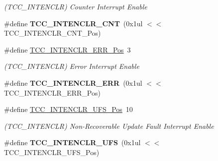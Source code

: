 \begin{DoxyCompactItemize}
\begin{DoxyCompactList}\small\item\em (T\+C\+C\+\_\+\+I\+N\+T\+E\+N\+C\+L\+R) Counter Interrupt Enable \end{DoxyCompactList}\item 
\hypertarget{group___s_a_m_l21___t_c_c_ga80b15d793dfb0ca03c09e24dbba46d4a}{}\#define {\bfseries T\+C\+C\+\_\+\+I\+N\+T\+E\+N\+C\+L\+R\+\_\+\+C\+N\+T}~(0x1ul $<$$<$ T\+C\+C\+\_\+\+I\+N\+T\+E\+N\+C\+L\+R\+\_\+\+C\+N\+T\+\_\+\+Pos)\label{group___s_a_m_l21___t_c_c_ga80b15d793dfb0ca03c09e24dbba46d4a}

\item 
\hypertarget{group___s_a_m_l21___t_c_c_ga6ca843c8d9e9aabc9903b21c4791dd87}{}\#define \hyperlink{group___s_a_m_l21___t_c_c_ga6ca843c8d9e9aabc9903b21c4791dd87}{T\+C\+C\+\_\+\+I\+N\+T\+E\+N\+C\+L\+R\+\_\+\+E\+R\+R\+\_\+\+Pos}~3\label{group___s_a_m_l21___t_c_c_ga6ca843c8d9e9aabc9903b21c4791dd87}

\begin{DoxyCompactList}\small\item\em (T\+C\+C\+\_\+\+I\+N\+T\+E\+N\+C\+L\+R) Error Interrupt Enable \end{DoxyCompactList}\item 
\hypertarget{group___s_a_m_l21___t_c_c_ga8f467e378711185fa725f71ea3832fe3}{}\#define {\bfseries T\+C\+C\+\_\+\+I\+N\+T\+E\+N\+C\+L\+R\+\_\+\+E\+R\+R}~(0x1ul $<$$<$ T\+C\+C\+\_\+\+I\+N\+T\+E\+N\+C\+L\+R\+\_\+\+E\+R\+R\+\_\+\+Pos)\label{group___s_a_m_l21___t_c_c_ga8f467e378711185fa725f71ea3832fe3}

\item 
\hypertarget{group___s_a_m_l21___t_c_c_gafa9fdbb8daa0b862f0eb65cdd1f2c826}{}\#define \hyperlink{group___s_a_m_l21___t_c_c_gafa9fdbb8daa0b862f0eb65cdd1f2c826}{T\+C\+C\+\_\+\+I\+N\+T\+E\+N\+C\+L\+R\+\_\+\+U\+F\+S\+\_\+\+Pos}~10\label{group___s_a_m_l21___t_c_c_gafa9fdbb8daa0b862f0eb65cdd1f2c826}

\begin{DoxyCompactList}\small\item\em (T\+C\+C\+\_\+\+I\+N\+T\+E\+N\+C\+L\+R) Non-\/\+Recoverable Update Fault Interrupt Enable \end{DoxyCompactList}\item 
\hypertarget{group___s_a_m_l21___t_c_c_gaa09c59f3a19505bf60454902e889a3ac}{}\#define {\bfseries T\+C\+C\+\_\+\+I\+N\+T\+E\+N\+C\+L\+R\+\_\+\+U\+F\+S}~(0x1ul $<$$<$ T\+C\+C\+\_\+\+I\+N\+T\+E\+N\+C\+L\+R\+\_\+\+U\+F\+S\+\_\+\+Pos)\label{group___s_a_m_l21___t_c_c_gaa09c59f3a19505bf60454902e889a3ac}


\end{DoxyCompactItemize}
